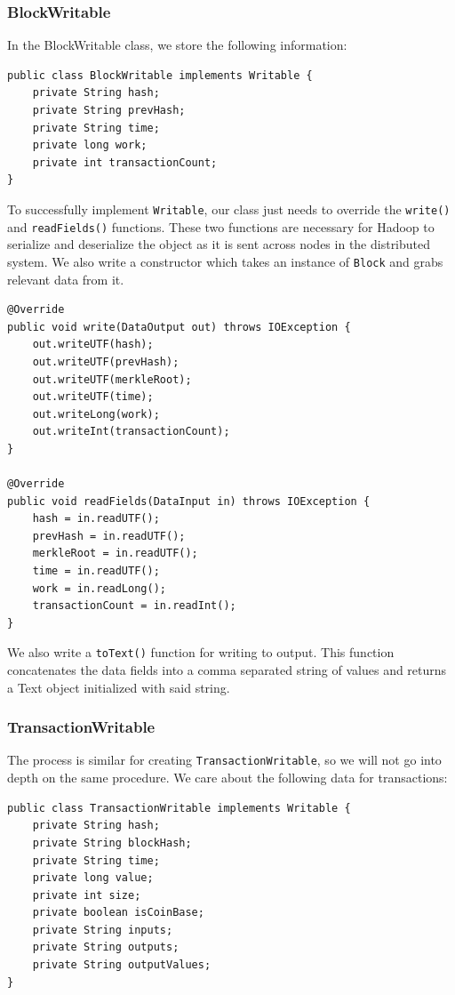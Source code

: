 \documentclass[9pt,twocolumn,twoside]{idsi}
\begin{document}
\subsubsection{BlockWritable}
In the BlockWritable class, we store the following information:

\begin{lstlisting}
public class BlockWritable implements Writable {
    private String hash;
    private String prevHash;
    private String time;
    private long work;
    private int transactionCount;
}
\end{lstlisting}

To successfully implement \lstinline{Writable}, our class just needs to override the \lstinline{write()} and \lstinline{readFields()} functions. These two functions are necessary for Hadoop to serialize and deserialize the object as it is sent across nodes in the distributed system. We also write a  constructor which takes an instance of \lstinline{Block} and grabs relevant data from it.

\begin{lstlisting}
@Override
public void write(DataOutput out) throws IOException {
    out.writeUTF(hash);
    out.writeUTF(prevHash);
    out.writeUTF(merkleRoot);
    out.writeUTF(time);
    out.writeLong(work);
    out.writeInt(transactionCount);
}

@Override
public void readFields(DataInput in) throws IOException {
    hash = in.readUTF();
    prevHash = in.readUTF();
    merkleRoot = in.readUTF();
    time = in.readUTF();
    work = in.readLong();
    transactionCount = in.readInt();
}
\end{lstlisting}

We also write a \lstinline{toText()} function for writing to output. This function concatenates the data fields into a comma separated string of values and returns a Text object initialized with said string.

\subsubsection{TransactionWritable}
The process is similar for creating \lstinline{TransactionWritable}, so we will not go into depth on the same procedure. We care about the following data for transactions:

\begin{lstlisting}
public class TransactionWritable implements Writable {
    private String hash;
    private String blockHash;
    private String time;
    private long value;
    private int size;
    private boolean isCoinBase;
    private String inputs;
    private String outputs;
    private String outputValues;
}
\end{lstlisting}
\end{document}
